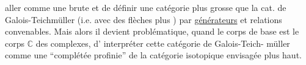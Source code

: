 aller comme une brute et de définir
une catégorie plus grosse que la cat.
de Galois-Teichmüller (i.e. avec
des flèches plus ) par \uline{générateurs}
et relations convenables. Mais alors il
devient problématique, quand le corps de
base est le corps $\mathbb C$ des complexes, d'
interpréter cette catégorie de Galois-Teich-
müller comme une ``complétée profinie''
de la catégorie isotopique envisagée plus
haut.
